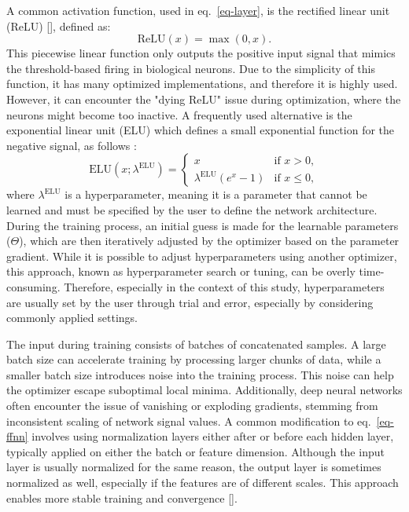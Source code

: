 \documentclass[12pt,a4paper]{report}
\begin{document}
A common activation function, used in eq.~\ref{eq-layer}, is the rectified linear unit (ReLU) [\cite{fukushima1980,nair2010}], defined as:
%
\begin{equation}
\text{ReLU}(x) = \max(0, x).
\end{equation}
%
This piecewise linear function only outputs the positive input signal that mimics the threshold-based firing in biological neurons. Due to the simplicity of this function, it has many optimized implementations, and therefore it is highly used.  However, it can encounter the "dying ReLU" issue during optimization, where the neurons might become too inactive. A frequently used alternative is the exponential linear unit (ELU) which defines a small exponential function for the negative signal, as follows :
%
\begin{equation}
 \text{ELU}(x;\lambda^{\text{ELU}}) = 
\begin{cases} 
x & \text{if } x > 0, \\
\lambda^{\text{ELU}} (e^x - 1) & \text{if } x \leq 0,
\end{cases}
\end{equation}
%
where $\lambda^{\text{ELU}}$ is a hyperparameter, meaning it is a parameter that cannot be learned and must be specified by the user to define the network architecture. During the training process, an initial guess is made for the learnable parameters ($\Theta$), which are then iteratively adjusted by the optimizer based on the parameter gradient. While it is possible to adjust hyperparameters using another optimizer, this approach, known as hyperparameter search or tuning, can be overly time-consuming. Therefore, especially in the context of this study, hyperparameters are usually set by the user through trial and error, especially by considering commonly applied settings.

The input during training consists of batches of concatenated samples. A large batch size can accelerate training by processing larger chunks of data, while a smaller batch size introduces noise into the training process. This noise can help the optimizer escape suboptimal local minima. Additionally, deep neural networks often encounter the issue of vanishing or exploding gradients, stemming from inconsistent scaling of network signal values. A common modification to eq.~\ref{eq-ffnn} involves using normalization layers either after or before each hidden layer, typically applied on either the batch or feature dimension. Although the input layer is usually normalized for the same reason, the output layer is sometimes normalized as well, especially if the features are of different scales. This approach enables more stable training and convergence [\cite{ioffe2015, bjorck2018, jingjing2019, gao2020, singh2022}].
\end{document}
